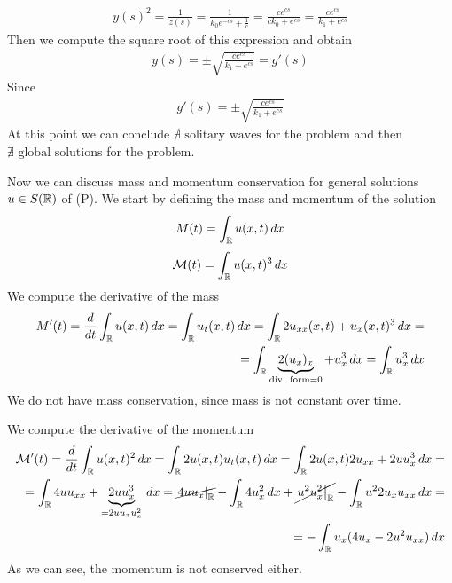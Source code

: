 \[
    \begin{split}
        y(s)^2 = \frac{1}{z(s)} = \frac{1}{k_0 e^{-cs} + \frac{1}{c}} = \frac{c e^{cs}}{c k_0 + e^{cs}} = \frac{c e^{cs}}{k_1 + e^{cs}}
    \end{split}
\]
Then we compute the square root of this expression and obtain
\[
    \begin{split}
        y(s) = \pm \sqrt{\frac{c e^{cs}}{k_1 + e^{cs}}} = g'(s)
    \end{split}
\]
Since
\[
    \begin{split}
        g'(s) = \pm \sqrt{\frac{c e^{cs}}{k_1 + e^{cs}}}
    \end{split}
\]
At this point we can conclude \(\nexists \text{ solitary waves}\) for the
problem and then \(\nexists \text{ global solutions}\) for the problem.

Now we can discuss mass and momentum conservation for general solutions \(u \in
S(\mathbb{R})\) of (P). We start by defining the mass and momentum of the solution
\[
    M(t) = \int_{\mathbb{R}} u(x,t) \, dx
\]
\[
    \mathcal{M}(t) = \int_{\mathbb{R}} u(x,t)^3 \, dx
\]
We compute the derivative of the mass
\[
    \begin{split}
        M'(t) = \frac{d}{dt} \int_{\mathbb{R}} u(x,t) \, dx = \int_{\mathbb{R}} u_t(x,t) \, dx = \int_{\mathbb{R}} 2u_{xx}(x,t) + u_x(x,t)^3 \, dx = \\
        = \int_{\mathbb{R}} \underbrace{2(u_x)_x}_{\text{div. form} = 0} + u_x^3 \, dx = \int_{\mathbb{R}} u_x^3 \, dx
    \end{split}
\]
We do not have mass conservation, since mass is not constant over time.

We compute the derivative of the momentum
\[
    \begin{split}
        \mathcal{M}'(t) = \frac{d}{dt} \int_{\mathbb{R}} u(x,t)^2 \, dx = \int_{\mathbb{R}} 2 u(x,t) u_t(x,t) \, dx = \int_{\mathbb{R}} 2 u(x,t) 2u_{xx} + 2u u_x^3 \, dx=                                                                               \\
        = \int_{\mathbb{R}} 4 u u_{xx} + \underbrace{2u u_x^3}_{= 2 u u_x u_x^2} \, dx =  \cancel{\left. 4 u u_x \right|_{\mathbb{R}}} - \int_{\mathbb{R}} 4 u_x^2 \, dx + \cancel{\left. u^2 u_x^2 \right|_{\mathbb{R}}} - \int_{\mathbb{R}} u^2 2 u_x u_{xx} \, dx = \\
        = - \int_{\mathbb{R}} u_x (4 u_x - 2 u^2 u_{xx}) \, dx
    \end{split}
\]
As we can see, the momentum is not conserved either.

